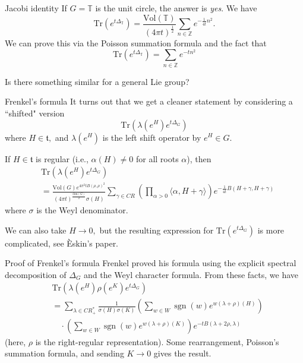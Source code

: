 \documentclass{beamer}
\numberwithin{equation}{section}
\theoremstyle{plain}
\theoremstyle{plain}
\theoremstyle{definition}
\theoremstyle{plain}
\theoremstyle{plain}
\theoremstyle{definition}
\newcommand{\Itgr}{\mathbb{Z}}
\newcommand{\Circ}{\mathbb{T}}
\newcommand{\Tr}{\mathrm{Tr}}
\newcommand{\sgn}{\operatorname{sgn}}
\newcommand{\tf}{\mathfrak{t}}
\begin{document}
\begin{frame}{Jacobi identity}
  If $G = \Circ$ is the unit circle, the answer is \emph{yes}. We have
  \[
    \Tr(e^{t\Delta_{\Circ}}) = \frac{\mathrm{Vol}(\Circ)}{(4\pi t)^{\frac12}}\sum_{n\in \Itgr} e^{-\frac{1}{4t}n^2}.
  \]
  We can prove this via the Poisson summation formula and the fact that
  \[
    \Tr(e^{t\Delta_{\Circ}}) = \sum_{n\in \Itgr} e^{-tn^2}
  \]
  
  Is there something similar for a general Lie group?
\end{frame}

\begin{frame}{Frenkel's formula}
  It turns out that we get a cleaner statement by considering a ``shifted" version
  \[
    \Tr(\lambda(e^H)e^{t\Delta_G})
  \]
  where $H\in \tf,$ and $\lambda(e^H)$ is the left shift operator by $e^H\in G.$
  \begin{theorem}
      If $H\in \tf$ is regular (i.e., $\alpha(H)\neq 0$ for all roots $\alpha$), then
      \begin{align*}
          &\Tr(\lambda(e^H)e^{t\Delta_G})\\
          &= \frac{\mathrm{Vol}(G)e^{4\pi^2tB(\rho,\rho)^2}}{(4\pi t)^{\frac{\mathrm{dim}(G)}{2}}\sigma(H)}\sum_{\gamma \in CR} \left(\prod_{\alpha>0} \langle \alpha,H+\gamma\rangle\right) e^{-\frac{1}{4t}B(H+\gamma,H+\gamma)}
      \end{align*}
      where $\sigma$ is the Weyl denominator.
  \end{theorem}
  \pause
  We can also take $H\to 0,$ but the resulting expression for $\Tr(e^{t\Delta_G})$ is more complicated, see \`{E}skin's paper.
\end{frame}

\begin{frame}{Proof of Frenkel's formula}
    Frenkel proved his formula using the explicit spectral decomposition of $\Delta_G$ and the Weyl character formula. From these facts, we have
    \begin{align*}
      &\Tr(\lambda(e^H)\rho(e^K)e^{t\Delta_G})\\ 
      &= \sum_{\lambda \in CR^*_+} \frac{1}{\sigma(H)\sigma(K)}\left(\sum_{w \in W} \sgn(w)e^{w(\lambda+\rho)(H)}\right)\\
      &\quad \cdot \left(\sum_{w\in W} \sgn(w)e^{w(\lambda+\rho)(K)}\right)e^{-tB(\lambda+2\rho,\lambda)}
    \end{align*}
    (here, $\rho$ is the right-regular representation).
    Some rearrangement, Poisson's summation formula, and sending $K\to 0$ gives the result.
\end{frame}
\end{document}

